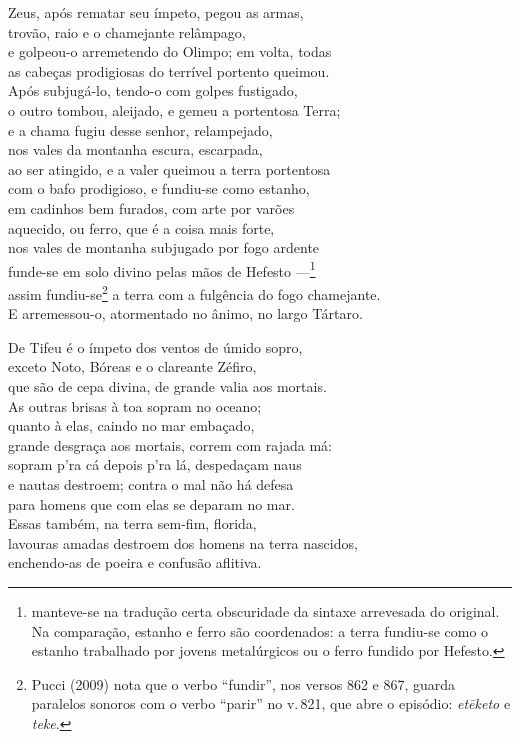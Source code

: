 \quad{}Zeus, após rematar seu ímpeto, pegou as armas,\\
trovão, raio e o chamejante relâmpago,\\
e golpeou-o arremetendo do Olimpo; em volta, todas \\
as cabeças prodigiosas do terrível portento queimou.\\
Após subjugá-lo, tendo-o com golpes fustigado,\\
o outro tombou, aleijado, e gemeu a portentosa Terra;\\
e a chama fugiu desse senhor, relampejado,\\
nos vales da montanha escura, escarpada, \\
ao ser atingido, e a valer queimou a terra portentosa\\
com o bafo prodigioso, e fundiu-se como estanho,\\
em cadinhos bem furados, com arte por varões\\
aquecido, ou ferro, que é a coisa mais forte,\\
nos vales de montanha subjugado por fogo ardente \\
funde-se em solo divino pelas mãos de Hefesto ---\footnote{manteve-se na tradução certa obscuridade da sintaxe arrevesada do original. Na comparação, estanho e ferro são coordenados: a terra
fundiu-se como o estanho trabalhado por jovens metalúrgicos ou o ferro
fundido por Hefesto.}\\
assim fundiu-se\footnote{Pucci (2009) nota que o verbo ``fundir'', nos versos 862 e 867, guarda paralelos sonoros com o verbo ``parir'' no v.\,821, que abre o
episódio: \emph{etēketo} e \emph{teke}.} a terra com a fulgência do fogo chamejante.\\
E arremessou-o, atormentado no ânimo, no largo Tártaro.

\quad{}De Tifeu é o ímpeto dos ventos de úmido sopro,\\
exceto Noto, Bóreas e o clareante Zéfiro, \\
que são de cepa divina, de grande valia aos mortais.\\
As outras brisas à toa sopram no oceano;\\
quanto à elas, caindo no mar embaçado,\\
grande desgraça aos mortais, correm com rajada má:\\
sopram p'ra cá depois p'ra lá, despedaçam naus \\
e nautas destroem; contra o mal não há defesa\\
para homens que com elas se deparam no mar.\\
Essas também, na terra sem-fim, florida,\\
lavouras amadas destroem dos homens na terra nascidos,\\
enchendo-as de poeira e confusão aflitiva. 

